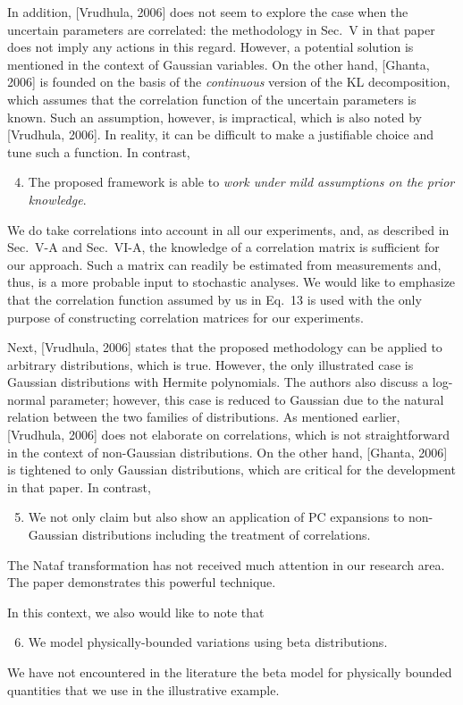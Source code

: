 \begin{authors}
In addition, [Vrudhula, 2006] does not seem to explore the case when the uncertain parameters are correlated: the methodology in Sec.~V in that paper does not imply any actions in this regard.
However, a potential solution is mentioned in the context of Gaussian variables.
On the other hand, [Ghanta, 2006] is founded on the basis of the \emph{continuous} version of the KL decomposition, which assumes that the correlation function of the uncertain parameters is known.
Such an assumption, however, is impractical, which is also noted by [Vrudhula, 2006].
In reality, it can be difficult to make a justifiable choice and tune such a function.
In contrast,
\begin{enumerate}
  \setcounter{enumi}{3}
  \item The proposed framework is able to \emph{work under mild assumptions on the prior knowledge}.
\end{enumerate}
We do take correlations into account in all our experiments, and, as described in Sec.~V-A and Sec.~VI-A, the knowledge of a correlation matrix is sufficient for our approach.
Such a matrix can readily be estimated from measurements and, thus, is a more probable input to stochastic analyses.
We would like to emphasize that the correlation function assumed by us in Eq.~13 is used with the only purpose of constructing correlation matrices for our experiments.

Next, [Vrudhula, 2006] states that the proposed methodology can be applied to arbitrary distributions, which is true.
However, the only illustrated case is Gaussian distributions with Hermite polynomials.
The authors also discuss a log-normal parameter; however, this case is reduced to Gaussian due to the natural relation between the two families of distributions.
As mentioned earlier, [Vrudhula, 2006] does not elaborate on correlations, which is not straightforward in the context of non-Gaussian distributions.
On the other hand, [Ghanta, 2006] is tightened to only Gaussian distributions, which are critical for the development in that paper.
In contrast,
\begin{enumerate}
  \setcounter{enumi}{4}
  \item We not only claim but also show an application of PC expansions to non-Gaussian distributions including the treatment of correlations.
\end{enumerate}
The Nataf transformation has not received much attention in our research area.
The paper demonstrates this powerful technique.

In this context, we also would like to note that
\begin{enumerate}
  \setcounter{enumi}{5}
  \item We model physically-bounded variations using beta distributions.
\end{enumerate}
We have not encountered in the literature the beta model for physically bounded quantities that we use in the illustrative example.


\end{authors}
